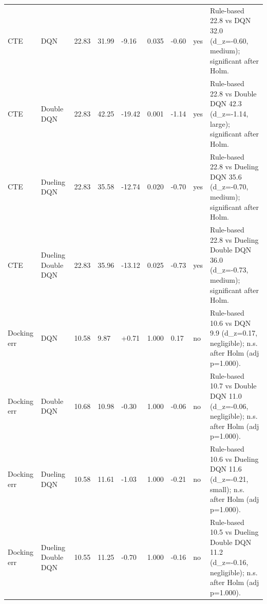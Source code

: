 \begin{tabular}{lllllllll}
CTE & DQN & 22.83 & 31.99 & -9.16 & 0.035 & -0.60 & yes & Rule-based 22.8 vs DQN 32.0 (d\_z=-0.60, medium); significant after Holm. \\
CTE & Double DQN & 22.83 & 42.25 & -19.42 & 0.001 & -1.14 & yes & Rule-based 22.8 vs Double DQN 42.3 (d\_z=-1.14, large); significant after Holm. \\
CTE & Dueling DQN & 22.83 & 35.58 & -12.74 & 0.020 & -0.70 & yes & Rule-based 22.8 vs Dueling DQN 35.6 (d\_z=-0.70, medium); significant after Holm. \\
CTE & Dueling Double DQN & 22.83 & 35.96 & -13.12 & 0.025 & -0.73 & yes & Rule-based 22.8 vs Dueling Double DQN 36.0 (d\_z=-0.73, medium); significant after Holm. \\
Docking err & DQN & 10.58 & 9.87 & +0.71 & 1.000 & 0.17 & no & Rule-based 10.6 vs DQN 9.9 (d\_z=0.17, negligible); n.s. after Holm (adj p=1.000). \\
Docking err & Double DQN & 10.68 & 10.98 & -0.30 & 1.000 & -0.06 & no & Rule-based 10.7 vs Double DQN 11.0 (d\_z=-0.06, negligible); n.s. after Holm (adj p=1.000). \\
Docking err & Dueling DQN & 10.58 & 11.61 & -1.03 & 1.000 & -0.21 & no & Rule-based 10.6 vs Dueling DQN 11.6 (d\_z=-0.21, small); n.s. after Holm (adj p=1.000). \\
Docking err & Dueling Double DQN & 10.55 & 11.25 & -0.70 & 1.000 & -0.16 & no & Rule-based 10.5 vs Dueling Double DQN 11.2 (d\_z=-0.16, negligible); n.s. after Holm (adj p=1.000). \\
\bottomrule
\end{tabular}
